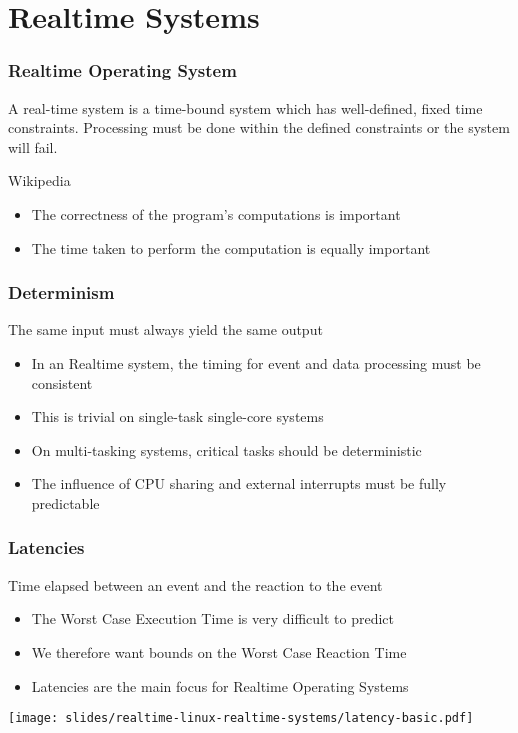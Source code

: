 \section{Realtime Systems}

\begin{frame}
  \frametitle{Realtime Operating System}
   A real-time system is a time-bound system which has well-defined, fixed time constraints. Processing must be done within the defined constraints or the system will fail.

	\begin{center}\footnotesize{Wikipedia}\end{center}
		\begin{itemize}
			\item The correctness of the program's computations is important
			\item The time taken to perform the computation is equally important
		\end{itemize}
\end{frame}

\begin{frame}
  \frametitle{Determinism}
  The same input must always yield the same output
	\begin{itemize}
		\item In an Realtime system, the timing for event and data processing must be consistent
		\item This is trivial on single-task single-core systems
		\item On multi-tasking systems, critical tasks should be deterministic
		\item The influence of CPU sharing and external interrupts must be fully predictable
	\end{itemize}
\end{frame}

\begin{frame}
  \frametitle{Latencies}
  Time elapsed between an event and the reaction to the event
	\begin{itemize}
		\item The Worst Case Execution Time is very difficult to predict
		\item We therefore want bounds on the Worst Case Reaction Time
		\item Latencies are the main focus for Realtime Operating Systems
	\end{itemize}
	\begin{center}
		\texttt{[image: slides/realtime-linux-realtime-systems/latency-basic.pdf]}
	\end{center}
\end{frame}

